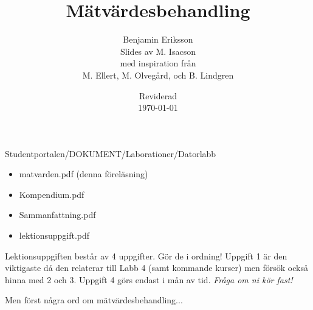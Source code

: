 \documentclass[9pt]{beamer}
\title{Mätvärdesbehandling}
\author[benjamin.eriksson@physics.uu.se]{Benjamin Eriksson  \\ \vspace{0.5cm} \scriptsize{Slides av M. Isacson} \\ \tiny{med inspiration från} \\ \scriptsize{M. Ellert, M. Olvegård, och B. Lindgren}}
\institute[Uppsala universitet]{{\small Avdelningen för tillämpad kärnfysik \\ Institutionen för fysik och astronomi} \\ \uulogo}
\date{{\small Reviderad}\\ \today}
\begin{document}
    \frame{\titlepage}

    \begin{frame}
        Studentportalen/DOKUMENT/Laborationer/Datorlabb
        \begin{itemize}
            \item matvarden.pdf (denna föreläsning)
            \item Kompendium.pdf
            \item Sammanfattning.pdf
            \item lektionsuppgift.pdf
        \end{itemize}

        \vfill

        Lektionsuppgiften består av 4 uppgifter. Gör de i ordning! Uppgift 1 är den
        viktigaste då den relaterar till Labb 4 (samt kommande kurser) men försök
        också hinna med 2 och 3. Uppgift 4 görs endast i mån av tid. \emph{Fråga om ni kör fast!}

        \vfill

        Men först några ord om mätvärdesbehandling...
    \end{frame}


   
\end{document}
